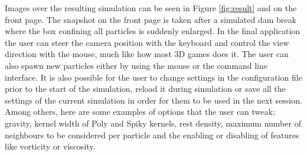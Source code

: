 Images over the resulting simulation can be seen in Figure \ref{fig:result} and on the front page. The snapshot on the front page is taken after a simulated dam break where the box confining all particles is suddenly enlarged. 
In the final application the user can steer the camera position with the keyboard and control the view direction with the mouse, much like how most 3D games does it. The user can also spawn new particles either by using the mouse or the command line interface. It is also possible for the user to change settings in the configuration file prior to the start of the simulation, reload it during simulation or save all the settings of the current simulation in order for them to be used in the next session. Among others, here are some examples of options that the user can tweak; gravity, kernel width of Poly and Spiky kernels, rest density, maximum number of neighbours to be considered per particle and the enabling or disabling of features like vorticity or viscosity.

